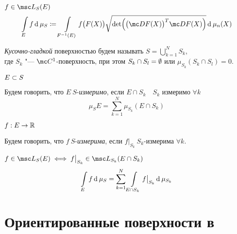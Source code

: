 \begin{definition}
	$ f \in \msc L_S(E) $
	$$ \int\limits_E f \di \mu_S \coloneq \int\limits_{F^{-1}(E)} f \bigl( F(X) \bigr) \sqrt{ \det \Bigl( \bigl(  \mc DF(X) \bigr)^T \mc DF(X) \Bigr)} \di \mu_n(X) $$
\end{definition}

\begin{definition}
	\emph{Кусочно-гладкой} поверхностью будем называть $ S = \bigcup_{k = 1}^N S_k $, \\
	где $ S_k $ "--- $ \mc C^1 $-поверхность, при этом $ S_k \cap S_l = \emptyset $ или $ \mu_{S_k}(S_k \cap S_l) = 0 $.
\end{definition}

\begin{definition}
	$ E \subset S $

	Будем говорить, что $ E ~ S $-\emph{измеримо}, если $ E \cap S_k \quad S_k $ измеримо $ \forall k $
	$$ \mu_S E = \sum_{k = 1}^N \mu_{S_k}(E \cap S_k) $$
\end{definition}

\begin{definition}
	$ f : E \to \mathbb{R} $

	Будем говорить, что $ f ~ S $-\emph{измерима}, если $ f\big|_{S_k} ~ S_k $-измерима $ \forall k $.
\end{definition}

\begin{definition}
	$ f \in \msc L_S(E) \iff f\big|_{S_k} \in \msc L_{S_k}(E \cap S_k) $
	$$ \int\limits_E f \operatorname{d}^{} \mu_S = \sum_{k = 1}^N \int\limits_{E \cap S_k} f\big|_{S_k} \operatorname{d}^{} \mu_{S_k} $$
\end{definition}

\section{Ориентированные поверхности в }

